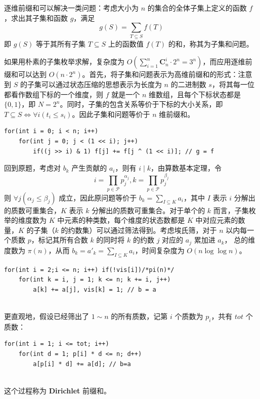 \documentclass[12pt,a4paper]{article}
\begin{document}
逐维前缀和可以解决一类问题：考虑大小为 $n$ 的集合的全体子集上定义的函数 $f$，求出其子集和函数 $g$，满足
\begin{equation*}
	\displaystyle g(S)=\sum_{T\subseteq S}f(T)
\end{equation*}
即 $g(S)$ 等于其所有子集 $T\subseteq S$ 上的函数值 $f(T)$ 的和，称其为子集和问题。

如果用朴素的子集枚举求解，复杂度为 $\displaystyle O(\sum_{i=1}^{n}\mathbf{C}_{n}^{i}\cdot2^n=3^n)$，而应用逐维前缀和可以达到 $O(n\cdot2^n)$。首先，将子集和问题表示为高维前缀和的形式：注意到 $S$ 的子集可以通过状态压缩的思想表示为长度为 $n$ 的二进制数 $s$，将其每一位都看作数组下标的一个维度，则 $f$ 就是一个 $n$ 维数组，且每个下标状态都是 $\{0,1\}$，即 $N=2^n$。同时，子集的包含关系等价于下标的大小关系，即 $T\subseteq S\iff\forall i(t_i\le s_i)$。因此子集和问题等价于 $n$ 维前缀和。

\begin{lstlisting}
for(int i = 0; i < n; i++) 
	for(int j = 0; j < (1 << i); j++) 
		if((j >> i) & 1) f[j] += f[j ^ (1 << i)]; // g = f
\end{lstlisting}
回到原题，考虑对 $b_k$ 产生贡献的 $a_i$，则有 $i\mid k$，由算数基本定理，令 \begin{equation*}
	\displaystyle i=\prod_{p\in\mathcal{P}}p_j^{\alpha_j},k=\prod_{p\in\mathcal{P}}p_j^{\beta_j}
\end{equation*}
则 $\forall j(\alpha_j\le\beta_j)$ 成立，因此原问题等价于 $\displaystyle b_k=\sum_{I\subseteq K}a_i$，其中 $I$ 表示 $i$ 分解出的质数可重集合，$K$ 表示 $k$ 分解出的质数可重集合。对于单个的 $k$ 而言，子集枚举的维度数为 $K$ 中元素的种类数，每个维度的状态数都是 $K$ 中对应元素的数量，$K$ 的子集（$k$ 的约数集）可以通过筛法得到。考虑埃氏筛，对于 $n$ 以内每一个质数 $p$，标记其所有合数 $k$ 的同时将 $k$ 的约数 $j$ 对应的 $a_j$ 累加进 $a_k$， 总的维度数为 $\pi(n)$，从而 $\displaystyle b_k=a'_k=\sum_{I\subseteq K}a_i$，时间复杂度为 $O(n\log\log n)$。

\begin{lstlisting}
for(int i = 2;i <= n; i++) if(!vis[i])/*pi(n)*/ 
	for(int k = i, j = 1; k <= n; k += i, j++) 		
		a[k] += a[j], vis[k] = 1; // b = a
	
\end{lstlisting}
更直观地，假设已经筛出了 $1\sim n$ 的所有质数，记第 $i$ 个质数为 $p_i$，共有 $tot$ 个质数：

\begin{lstlisting}
for(int i = 1; i <= tot; i++)
	for(int d = 1; p[i] * d <= n; d++)
		a[p[i] * d] += a[d]; // b=a
	
\end{lstlisting}
这个过程称为 \textbf{Dirichlet} 前缀和。
\end{document}

